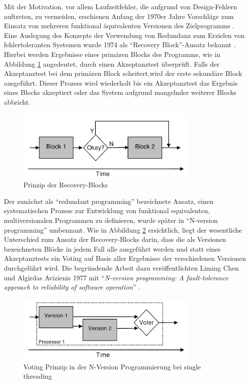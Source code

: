 %
Mit der Motivation, vor allem Laufzeitfehler, die aufgrund von Design-Fehlern auftreten, zu vermeiden, erschienen Anfang der 1970er Jahre Vorschläge zum Einsatz von mehreren funktional äquivalenten Versionen des Zielprogramms \cite{methodology}.
Eine Auslegung des Konzepts der Verwendung von Redundanz zum Erzielen von fehlertoleranten Systemen wurde 1974 als \enquote{Recovery Block}-Ansatz bekannt \cite{Horning:1974:PSE:647641.733522}.
Hierbei werden Ergebnisse eines primären Blocks des Programms, wie in Abbildung \ref{graph-recovery} angedeutet, durch einen Akzeptanztest überprüft.
Falls der Akzeptanztest bei dem primären Block scheitert,wird der erste sekundäre Block ausgeführt. Dieser Prozess wird wiederholt bis ein Akzeptanztest das Ergebnis eines Blocks akzeptiert oder das System aufgrund mangelnder weiterer Blocks abbricht.
%
%
\begin{figure}[ht]
	\centering
	\includegraphics[width=0.8\textwidth,natwidth=901,natheight=351]{grafiken/recovery-block.png}
	\caption{Prinzip der Recovery-Blocks \cite{lucent}}
	\label{graph-recovery}
\end{figure}
%
%
Der zunächst als \enquote{redundant programming} bezeichnete Ansatz, einen systematischen Prozess zur Entwicklung von funktional equivalenten, multiversionalen Programmen zu definieren, wurde später in \enquote{N-version programming} umbennant.
Wie in Abbildung \ref{graph-n-version-single} ersichtlich, liegt der wesentliche Unterschied zum Ansatz der Recovery-Blocks darin, dass die als Versionen bezeichneten Blöcke in jedem Fall alle ausgeführt werden und statt eines Akzeptanztests ein Voting auf Basis aller Ergebnisse der verschiedenen Versionen durchgeführt wird.
Die begründende Arbeit dazu veröffentlichten Liming Chen und Algirdas Avizienis 1977 mit \enquote{\emph{N-version programming: A fault-tolerance approach to reliability of software operation}} \cite{Chen1978}.
%
%
\begin{figure}[ht]
	\centering
	\includegraphics[width=0.8\textwidth,natwidth=901,natheight=333]{grafiken/single-thread-n-version.png}
	\caption{Voting Prinzip in der N-Version Programmierung bei single threading \cite{lucent}}
	\label{graph-n-version-single}
\end{figure}
%
%

